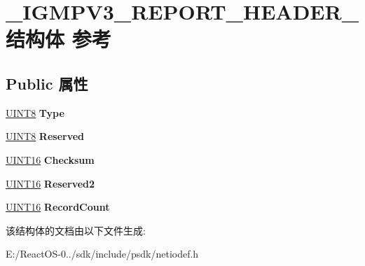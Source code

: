 \hypertarget{struct___i_g_m_p_v3___r_e_p_o_r_t___h_e_a_d_e_r__}{}\section{\+\_\+\+I\+G\+M\+P\+V3\+\_\+\+R\+E\+P\+O\+R\+T\+\_\+\+H\+E\+A\+D\+E\+R\+\_\+结构体 参考}
\label{struct___i_g_m_p_v3___r_e_p_o_r_t___h_e_a_d_e_r__}
\subsection*{Public 属性}
\begin{DoxyCompactItemize}
\item 
\mbox{\label{struct___i_g_m_p_v3___r_e_p_o_r_t___h_e_a_d_e_r___a43fc0ed95396bfcd52bca75e8b5ee5df}} 
\hyperlink{_processor_bind_8h_ab27e9918b538ce9d8ca692479b375b6a}{U\+I\+N\+T8} {\bfseries Type}
\item 
\mbox{\label{struct___i_g_m_p_v3___r_e_p_o_r_t___h_e_a_d_e_r___af43d34e7cda761b643452efc6ce1c374}} 
\hyperlink{_processor_bind_8h_ab27e9918b538ce9d8ca692479b375b6a}{U\+I\+N\+T8} {\bfseries Reserved}
\item 
\mbox{\label{struct___i_g_m_p_v3___r_e_p_o_r_t___h_e_a_d_e_r___a60db0b32c3fd4496c483ce5aff251e3f}} 
\hyperlink{_processor_bind_8h_a09f1a1fb2293e33483cc8d44aefb1eb1}{U\+I\+N\+T16} {\bfseries Checksum}
\item 
\mbox{\label{struct___i_g_m_p_v3___r_e_p_o_r_t___h_e_a_d_e_r___a8fdd0f945ba742800573989cac519c1d}} 
\hyperlink{_processor_bind_8h_a09f1a1fb2293e33483cc8d44aefb1eb1}{U\+I\+N\+T16} {\bfseries Reserved2}
\item 
\mbox{\label{struct___i_g_m_p_v3___r_e_p_o_r_t___h_e_a_d_e_r___a74c4709df9da2ebd965700995c0a2704}} 
\hyperlink{_processor_bind_8h_a09f1a1fb2293e33483cc8d44aefb1eb1}{U\+I\+N\+T16} {\bfseries Record\+Count}
\end{DoxyCompactItemize}


该结构体的文档由以下文件生成\+:\begin{DoxyCompactItemize}
\item 
E\+:/\+React\+O\+S-\/0../sdk/include/psdk/netiodef.\+h\end{DoxyCompactItemize}
